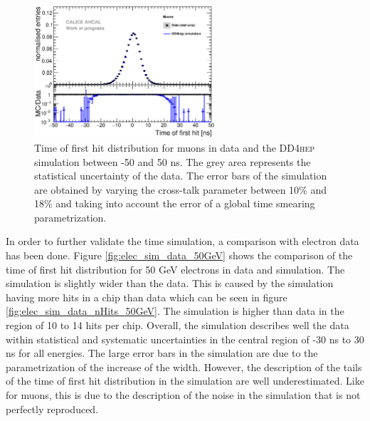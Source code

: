 \documentclass{JINST}
\newcommand\ddhep{\textsc{DD4hep}\xspace}
\begin{document}
\begin{figure}[htbp!]
  \centering
  \includegraphics[width=0.6\textwidth]{fig/Comparison_MokkaDD4hepData_Muons_DD4heponly.eps}
  \caption{Time of first hit distribution for muons in data and the \ddhep simulation between -50 and 50 ns. The grey area represents the statistical uncertainty of the data. The error bars of the simulation are obtained by varying the cross-talk parameter between 10\% and 18\% and taking into account the error of a global time smearing parametrization.}
  \label{fig:sim_data_muon}
\end{figure}

In order to further validate the time simulation, a comparison with electron data has been done. Figure \ref{fig:elec_sim_data_50GeV} shows the comparison of the time of first hit distribution for 50 GeV electrons in data and simulation. The simulation is slightly wider than the data. This is caused by the simulation having more hits in a chip than data which can be seen in figure \ref{fig:elec_sim_data_nHits_50GeV}. The simulation is higher than data in the region of 10 to 14 hits per chip. Overall, the simulation describes well the data within statistical and systematic uncertainties in the central region of -30 ns to 30 ns for all energies. The large error bars in the simulation are due to the parametrization of the increase of the width. However, the description of the tails of the time of first hit distribution in the simulation are well underestimated. Like for muons, this is due to the description of the noise in the simulation that is not perfectly reproduced.
\end{document}
